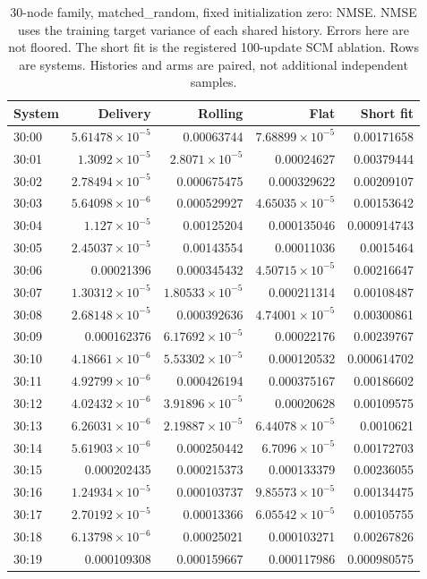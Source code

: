 \begin{table}[ht]
\centering\scriptsize
\begin{tabular}{lrrrr}
\toprule
System & Delivery & Rolling & Flat & Short fit\\
\midrule
30:00 & $5.61478\times10^{-5}$ & 0.00063744 & $7.68899\times10^{-5}$ & 0.00171658\\
30:01 & $1.3092\times10^{-5}$ & $2.8071\times10^{-5}$ & 0.00024627 & 0.00379444\\
30:02 & $2.78494\times10^{-5}$ & 0.000675475 & 0.000329622 & 0.00209107\\
30:03 & $5.64098\times10^{-6}$ & 0.000529927 & $4.65035\times10^{-5}$ & 0.00153642\\
30:04 & $1.127\times10^{-5}$ & 0.00125204 & 0.000135046 & 0.000914743\\
30:05 & $2.45037\times10^{-5}$ & 0.00143554 & 0.00011036 & 0.0015464\\
30:06 & 0.00021396 & 0.000345432 & $4.50715\times10^{-5}$ & 0.00216647\\
30:07 & $1.30312\times10^{-5}$ & $1.80533\times10^{-5}$ & 0.000211314 & 0.00108487\\
30:08 & $2.68148\times10^{-5}$ & 0.000392636 & $4.74001\times10^{-5}$ & 0.00300861\\
30:09 & 0.000162376 & $6.17692\times10^{-5}$ & 0.00022176 & 0.00239767\\
30:10 & $4.18661\times10^{-6}$ & $5.53302\times10^{-5}$ & 0.000120532 & 0.000614702\\
30:11 & $4.92799\times10^{-6}$ & 0.000426194 & 0.000375167 & 0.00186602\\
30:12 & $4.02432\times10^{-6}$ & $3.91896\times10^{-5}$ & 0.00020628 & 0.00109575\\
30:13 & $6.26031\times10^{-6}$ & $2.19887\times10^{-5}$ & $6.44078\times10^{-5}$ & 0.0010621\\
30:14 & $5.61903\times10^{-6}$ & 0.000250442 & $6.7096\times10^{-5}$ & 0.00172703\\
30:15 & 0.000202435 & 0.000215373 & 0.000133379 & 0.00236055\\
30:16 & $1.24934\times10^{-5}$ & 0.000103737 & $9.85573\times10^{-5}$ & 0.00134475\\
30:17 & $2.70192\times10^{-5}$ & 0.00013366 & $6.05542\times10^{-5}$ & 0.00105755\\
30:18 & $6.13798\times10^{-6}$ & 0.00025021 & 0.000103271 & 0.00267826\\
30:19 & 0.000109308 & 0.000159667 & 0.000117986 & 0.000980575\\
\bottomrule
\end{tabular}
\caption{30-node family, matched\_random, fixed initialization zero: NMSE. NMSE uses the training target variance of each shared history. Errors here are not floored. The short fit is the registered 100-update SCM ablation. Rows are systems. Histories and arms are paired, not additional independent samples.}
\end{table}
